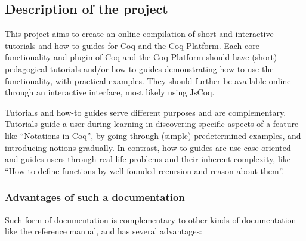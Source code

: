 \documentclass{easychair}
\begin{document}
\subsection{Description of the project}

This project aims to create an online compilation of short and interactive
tutorials and how-to guides for Coq and the Coq Platform.
Each core functionality and plugin of Coq and the Coq Platform should have
(short) pedagogical tutorials and/or how-to guides demonstrating how to use the
functionality, with practical examples. They should further be available online
through an interactive interface, most likely using JsCoq.

Tutorials and how-to guides serve different purposes and are complementary.
Tutorials guide a user during learning in discovering specific aspects of a
feature like ``Notations in Coq'', by going through (simple) predetermined
examples, and introducing notions gradually. In contrast, how-to guides are
use-case-oriented and guides users through real life problems and their inherent
complexity, like ``How to define functions by well-founded recursion and reason
about them''.

\subsubsection*{Advantages of such a documentation}

Such form of documentation is complementary to other kinds of documentation like
the reference manual, and has several advantages:
\end{document}
